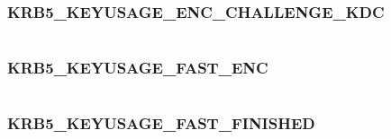 \documentclass[letterpaper,10pt,english]{sphinxmanual}
\begin{document}
\subsubsection{KRB5\_KEYUSAGE\_ENC\_CHALLENGE\_KDC}
\label{appdev/refs/macros/KRB5_KEYUSAGE_ENC_CHALLENGE_KDC:krb5-keyusage-enc-challenge-kdc-data}\label{appdev/refs/macros/KRB5_KEYUSAGE_ENC_CHALLENGE_KDC:krb5-keyusage-enc-challenge-kdc}\label{appdev/refs/macros/KRB5_KEYUSAGE_ENC_CHALLENGE_KDC::doc}

\begin{fulllineitems}
\label{appdev/refs/macros/KRB5_KEYUSAGE_ENC_CHALLENGE_KDC:KRB5_KEYUSAGE_ENC_CHALLENGE_KDC}
\end{fulllineitems}


\begin{tabulary}{\linewidth}{|L|L|}
\hline

 & 
\\
\hline\end{tabulary}



\subsubsection{KRB5\_KEYUSAGE\_FAST\_ENC}
\label{appdev/refs/macros/KRB5_KEYUSAGE_FAST_ENC:krb5-keyusage-fast-enc-data}\label{appdev/refs/macros/KRB5_KEYUSAGE_FAST_ENC:krb5-keyusage-fast-enc}\label{appdev/refs/macros/KRB5_KEYUSAGE_FAST_ENC::doc}

\begin{fulllineitems}
\label{appdev/refs/macros/KRB5_KEYUSAGE_FAST_ENC:KRB5_KEYUSAGE_FAST_ENC}
\end{fulllineitems}


\begin{tabulary}{\linewidth}{|L|L|}
\hline

 & 
\\
\hline\end{tabulary}



\subsubsection{KRB5\_KEYUSAGE\_FAST\_FINISHED}
\label{appdev/refs/macros/KRB5_KEYUSAGE_FAST_FINISHED:krb5-keyusage-fast-finished-data}\label{appdev/refs/macros/KRB5_KEYUSAGE_FAST_FINISHED::doc}\label{appdev/refs/macros/KRB5_KEYUSAGE_FAST_FINISHED:krb5-keyusage-fast-finished}
\end{document}
